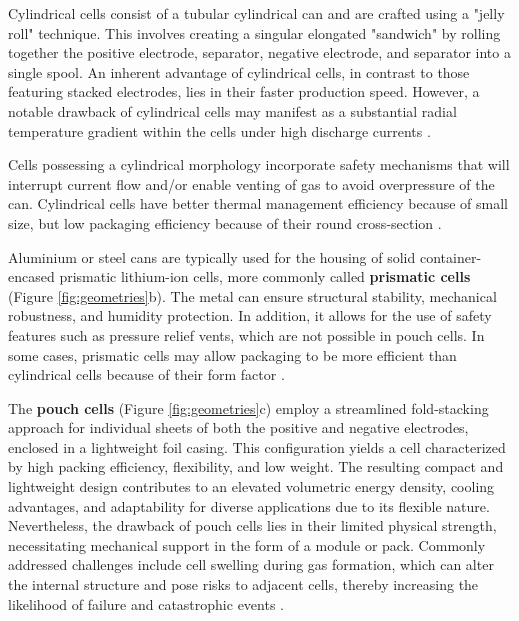 Cylindrical cells consist of a tubular cylindrical can and are crafted using a "jelly roll" technique. This involves creating a singular elongated "sandwich" by rolling together the positive electrode, separator, negative electrode, and separator into a single spool. An inherent advantage of cylindrical cells, in contrast to those featuring stacked electrodes, lies in their faster production speed. However, a notable drawback of cylindrical cells may manifest as a substantial radial temperature gradient within the cells under high discharge currents \cite{baazouzi2023design}.

Cells possessing a cylindrical morphology incorporate safety mechanisms that will interrupt current flow and/or enable venting of gas to avoid overpressure of the can. Cylindrical cells have better thermal management efficiency because of small size, but low packaging efficiency because of their round cross-section \cite{das2018joining}.

Aluminium or steel cans are typically used for the housing of solid container-encased prismatic lithium-ion cells, more commonly called \textbf{prismatic cells} (Figure \ref{fig:geometries}b). The metal can ensure structural stability, mechanical robustness, and humidity protection. In addition, it allows for the use of safety features such as pressure relief vents, which are not possible in pouch cells. In some cases, prismatic cells may allow packaging to be more efficient than cylindrical cells because of their form factor \cite{das2018joining}.

The \textbf{pouch cells} (Figure \ref{fig:geometries}c) employ a streamlined fold-stacking approach for individual sheets of both the positive and negative electrodes, enclosed in a lightweight foil casing. This configuration yields a cell characterized by high packing efficiency, flexibility, and low weight. The resulting compact and lightweight design contributes to an elevated volumetric energy density, cooling advantages, and adaptability for diverse applications due to its flexible nature. Nevertheless, the drawback of pouch cells lies in their limited physical strength, necessitating mechanical support in the form of a module or pack. Commonly addressed challenges include cell swelling during gas formation, which can alter the internal structure and pose risks to adjacent cells, thereby increasing the likelihood of failure and catastrophic events \cite{santhanagopalan2013modeling}.